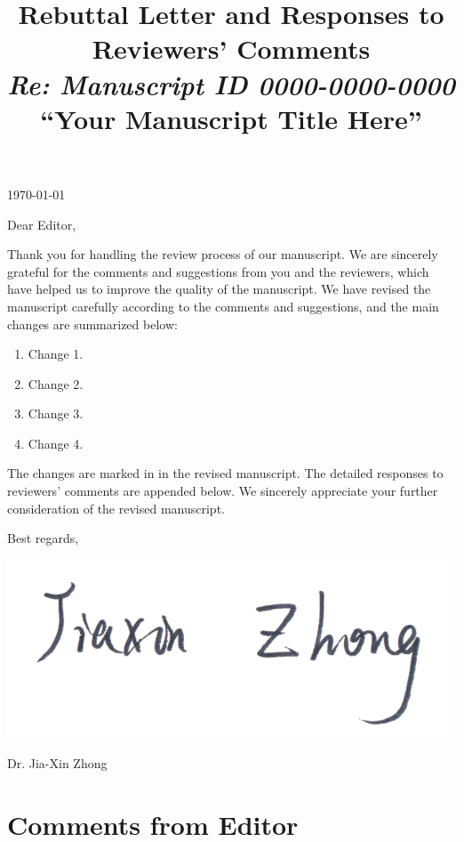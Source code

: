 \documentclass[12pt]{article}
\title{
    \vspace{2em}
    \textbf{\Large Rebuttal Letter and Responses to Reviewers' Comments}
    \\[-.5em]
    \textit{\large Re: Manuscript ID 0000-0000-0000}
    \\[-.5em]
    \textbf{\large ``Your Manuscript Title Here''}
    \vspace{-4em}
}
\begin{document}
\date{}
\maketitle

\thispagestyle{firststyle}

\noindent
\today

\noindent
Dear Editor,

Thank you for handling the review process of our manuscript.
We are sincerely grateful for the comments and suggestions from you and the reviewers, which have helped us
to improve the quality of the manuscript. We have revised the manuscript carefully according to
the comments and suggestions, and the main changes are summarized below:
\begin{enumerate}
    \item Change 1.
    \item Change 2.
    \item Change 3.
    \item Change 4.
\end{enumerate}

The changes are marked in  in the revised manuscript.
The detailed responses to reviewers' comments are appended below.
We sincerely appreciate your further consideration of the revised manuscript.


\lipsum[1-4]

Best regards,

\includegraphics[scale=0.8]{img/Signature-EN1-20181030.png}
\vspace{-1em}

Dr. Jia-Xin Zhong

\newpage
\section{Comments from Editor}
\begin{commentbox}
    \lipsum[1]
\end{commentbox}
\end{document}

